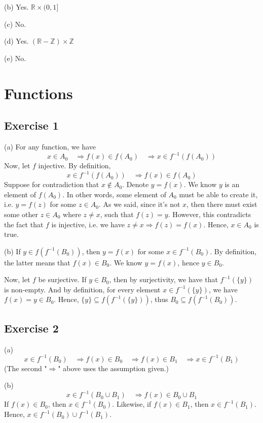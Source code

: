 \documentclass{book}
\begin{document}
\noindent
(b)
Yes. $\mathbb{R} \times (0, 1]$

\noindent
(c)
No.

\noindent
(d)
Yes. $(\mathbb{R} - \mathbb{Z}) \times \mathbb{Z}$

\noindent
(e)
No.

\section{Functions}

\subsection*{Exercise 1}
(a)
For any function, we have
$$x \in A_0 \quad \Rightarrow f(x) \in f(A_0) \quad \Rightarrow x \in f^{-1}(f(A_0))$$
Now, let $f$ injective. By definition,
$$x \in f^{-1}(f(A_0)) \quad \Rightarrow f(x) \in f(A_0)$$
Suppose for contradiction that $x \not \in A_0$. Denote $y = f(x)$. We know $y$ is an element of $f(A_0)$. In other words, some element of $A_0$ must be able to create it, i.e. $y = f(z)$ for some $z \in A_0$. As we said, since it's not $x$, then there must exist some other $z \in A_0$ where $z \neq x$, such that $f(z) = y$. However, this contradicts the fact that $f$ is injective, i.e. we have $z \neq x \Rightarrow f(z) = f(x)$. Hence, $x \in A_0$ is true.

\noindent
(b)
If $y \in f(f^{-1}(B_0))$, then $y = f(x)$ for some $x \in f^{-1}(B_0)$. By definition, the latter means that $f(x) \in B_0$. We know $y = f(x)$, hence $y \in B_0$.

Now, let $f$ be surjective. If $y \in B_0$, then by surjectivity, we have that $f^{-1}(\{ y \})$ is non-empty. And by definition, for every element $x \in f^{-1}(\{ y \})$, we have $f(x) = y \in B_0$. Hence, $\{ y \} \subseteq f(f^{-1}(\{ y \}))$, thus $B_0 \subseteq f(f^{-1}(B_0))$.

\subsection*{Exercise 2}
(a)
$$x \in f^{-1}(B_0) \quad \Rightarrow f(x) \in B_0 \quad \Rightarrow f(x) \in B_1 \quad \Rightarrow x \in f^{-1}(B_1)$$
(The second "$\Rightarrow$" above uses the assumption given.)

\noindent
(b)
$$x \in f^{-1}(B_0 \cup B_1) \quad \Rightarrow f(x) \in B_0 \cup B_1$$
If $f(x) \in B_0$, then $x \in f^{-1}(B_0)$. Likewise, if $f(x) \in B_1$, then $x \in f^{-1}(B_1)$. Hence, $x \in f^{-1}(B_0) \cup f^{-1}(B_1)$.
\end{document}
